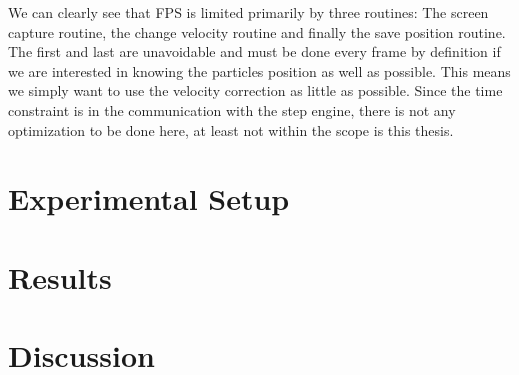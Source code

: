 \documentclass[]{report}
\begin{document}
We can clearly see that FPS is limited primarily by three routines: The screen capture routine, the change velocity routine and finally the save position routine. The first and last are unavoidable and must be done every frame by definition if we are interested in knowing the particles position as well as possible. This means we simply want to use the velocity correction as little as possible. Since the time constraint is in the communication with the step engine, there is not any optimization to be done here, at least not within the scope is this thesis. 


\chapter{Experimental Setup}


\chapter{Results}
\chapter{Discussion}

\end{document}
